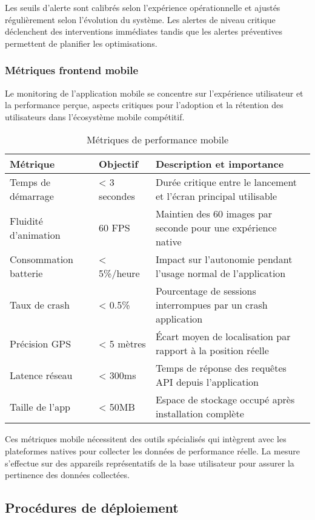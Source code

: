 Les seuils d'alerte sont calibrés selon l'expérience opérationnelle et ajustés régulièrement selon l'évolution du système. Les alertes de niveau critique déclenchent des interventions immédiates tandis que les alertes préventives permettent de planifier les optimisations.

\subsubsection{Métriques frontend mobile}

Le monitoring de l'application mobile se concentre sur l'expérience utilisateur et la performance perçue, aspects critiques pour l'adoption et la rétention des utilisateurs dans l'écosystème mobile compétitif.

\begin{table}[h]
\centering
\begin{tabular}{|l|l|p{5cm}|}
\hline
\textbf{Métrique} & \textbf{Objectif} & \textbf{Description et importance} \\
\hline
Temps de démarrage & < 3 secondes & Durée critique entre le lancement et l'écran principal utilisable \\
\hline
Fluidité d'animation & 60 FPS & Maintien des 60 images par seconde pour une expérience native \\
\hline
Consommation batterie & < 5\%/heure & Impact sur l'autonomie pendant l'usage normal de l'application \\
\hline
Taux de crash & < 0.5\% & Pourcentage de sessions interrompues par un crash application \\
\hline
Précision GPS & < 5 mètres & Écart moyen de localisation par rapport à la position réelle \\
\hline
Latence réseau & < 300ms & Temps de réponse des requêtes API depuis l'application \\
\hline
Taille de l'app & < 50MB & Espace de stockage occupé après installation complète \\
\hline
\end{tabular}
\caption{Métriques de performance mobile}
\end{table}

Ces métriques mobile nécessitent des outils spécialisés qui intègrent avec les plateformes natives pour collecter les données de performance réelle. La mesure s'effectue sur des appareils représentatifs de la base utilisateur pour assurer la pertinence des données collectées.

\subsection{Procédures de déploiement}

